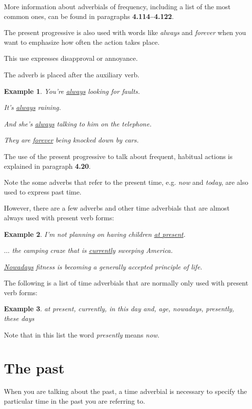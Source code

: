 \documentclass[oneside]{book}
\numberwithin{equation}{section}
\newtheorem{example}{Example}[section]
\begin{document}
%
More information about adverbials of frequency, including a list of the most common ones, can be found in paragraphs \textbf{4.114--4.122}.

%
\noindent{} The present progressive is also used with words like \textit{always} and \textit{forever} when you want to emphasize how often the action takes place.

This use expresses disapproval or annoyance.

The adverb is placed after the auxiliary verb.
\begin{example}
    You're \underline{always} looking for faults.
    
    It's \underline{always} raining.
    
    And she's \underline{always} talking to him on the telephone.
    
    They are \underline{forever} being knocked down by cars.
\end{example}
The use of the present progressive to talk about frequent, habitual actions is explained in paragraph \textbf{4.20}.

%
\noindent{} Note the some adverbs that refer to the present time, e.g. \textit{now} and \textit{today}, are also used to express past time.

However, there are a few adverbs and other time adverbials that are almost always used with present verb forms:
\begin{example}
    I'm not planning on having children \underline{at present}.
    
    $\ldots$ the camping craze that is \underline{currently} sweeping America.
    
    \underline{Nowadays} fitness is becoming a generally accepted principle of life.
\end{example}
The following is a list of time adverbials that are normally only used with present verb forms:
\begin{example}
    at present, currently, in this day and, age, nowadays, presently, these days
\end{example}
Note that in this list the word \textit{presently} means \textit{now}.

\section{The past}
\noindent{} When you are talking about the past, a time adverbial is necessary to specify the particular time in the past you are referring to.
\end{document}
